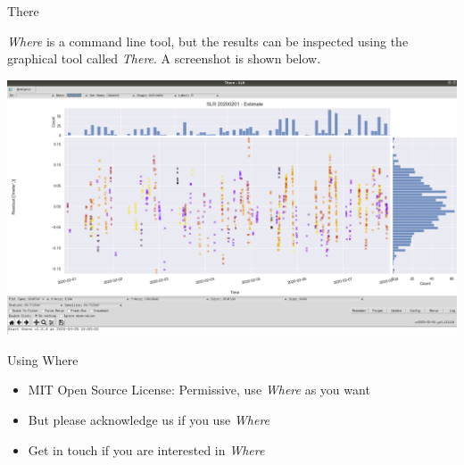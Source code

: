 \documentclass[12pt]{beamer}
\begin{document}
\begin{frame}{There}

\textit{Where} is a command line tool, but the results can be inspected using the graphical tool called \textit{There}. A screenshot is shown below.

\begin{center}
  \includegraphics[height=0.6\textheight]{./figure/there.png}
\end{center}
\end{frame}


\begin{frame}{Using Where}
\begin{itemize}
\item 
  MIT Open Source License: Permissive, use \textit{Where} as you want
\item
  But please acknowledge us if you use \textit{Where}
\item 
  Get in touch if you are interested in \textit{Where}
\end{itemize}
\end{frame}
\end{document}
